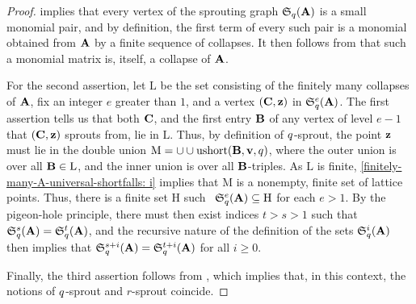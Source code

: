 \documentclass{amsart}
\begin{document}
\begin{proof}   implies that every vertex of the sprouting graph $\mathfrak{S}_q(\mathbf{A})$ is a small monomial pair, and by definition, the first term of every such pair is a monomial obtained from $\mathbf{A}$ by a finite sequence of collapses.  It then follows from  that such a monomial matrix is, itself, a collapse of $\mathbf{A}$.

For the second assertion, let $\mathrm{L}$ be the set consisting of the finitely many collapses of $\mathbf{A}$, fix an integer $e$ greater than $1$, and a vertex $(\mathbf{C}, \mathbf{z})$ in $\mathfrak{S}_{q}^e(\mathbf{A})$.  The first assertion tells us that both $\mathbf{C}$, and the first entry $\mathbf{B}$ of any vertex of level $e-1$ that $(\mathbf{C}, \mathbf{z})$ sprouts from, lie in $\mathrm{L}$.  Thus, by definition of $q$-sprout, the point $\mathbf{z}$ must lie in the double union $\mathrm{M} = \cup \cup \operatorname{ushort}(\mathbf{B}, \mathbf{v}, q)$, where the outer union is over all $\mathbf{B} \in \mathrm{L}$, and the inner union is over all $\mathbf{B}$-triples.    As $\mathrm{L}$ is finite, \ref{finitely-many-A-universal-shortfalls: i}  implies that $\mathrm{M}$ is a nonempty, finite set of lattice points.   Thus, there is a finite set $\mathrm{H}$ such \ $\mathfrak{S}_{q}^e(\mathbf{A}) \subseteq \mathrm{H}$ for each $e>1$.  By the pigeon-hole principle, there must then exist indices $t > s > 1$ such that $\mathfrak{S}_{q}^s(\mathbf{A}) = \mathfrak{S}_{q}^t(\mathbf{A})$, and the recursive nature of the definition of the sets $\mathfrak{S}_{q}^i(\mathbf{A})$ then implies that $\mathfrak{S}_{q}^{s+i}(\mathbf{A}) = \mathfrak{S}_{q}^{t+i}(\mathbf{A})$ for all $i \geq 0$.

Finally, the third assertion follows from , {which implies that, in this context, the notions of $q$-sprout and $r$-sprout coincide.}
\end{proof}
\end{document}
